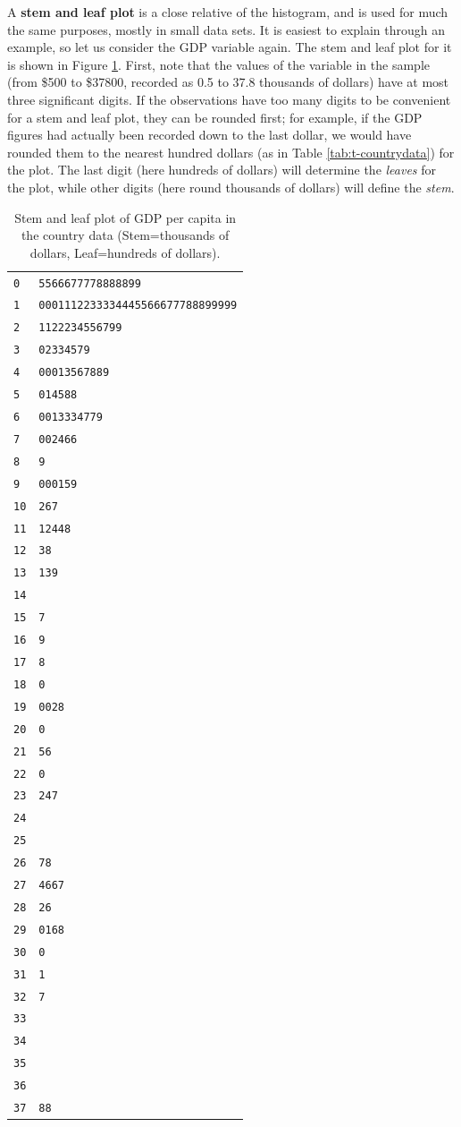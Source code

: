 \documentclass[11pt,a4paper,openany]{book}
\begin{document}
A \textbf{stem and leaf plot} is a close relative of the histogram, and
is used for much the same purposes, mostly in small data sets. It is
easiest to explain through an example, so let us consider the GDP
variable again. The stem and leaf plot for it is shown in Figure
\ref{tab:t-stemgdp}. First, note that the values of the variable in the
sample (from \$500 to \$37800, recorded as 0.5 to 37.8 thousands of
dollars) have at most three significant digits. If the observations have
too many digits to be convenient for a stem and leaf plot, they can be
rounded first; for example, if the GDP figures had actually been
recorded down to the last dollar, we would have rounded them to the
nearest hundred dollars (as in Table \ref{tab:t-countrydata}) for the
plot. The last digit (here hundreds of dollars) will determine the
\emph{leaves} for the plot, while other digits (here round thousands of
dollars) will define the \emph{stem}.

\begin{longtable}[]{@{}ll@{}}
\caption{\label{tab:t-stemgdp} Stem and leaf plot of GDP per capita in the
country data (Stem=thousands of dollars, Leaf=hundreds of
dollars).}\tabularnewline
\toprule
\texttt{0} & \texttt{5566677778888899}\tabularnewline
\texttt{1} & \texttt{0001112233334445566677788899999}\tabularnewline
\texttt{2} & \texttt{1122234556799}\tabularnewline
\texttt{3} & \texttt{02334579}\tabularnewline
\texttt{4} & \texttt{00013567889}\tabularnewline
\texttt{5} & \texttt{014588}\tabularnewline
\texttt{6} & \texttt{0013334779}\tabularnewline
\texttt{7} & \texttt{002466}\tabularnewline
\texttt{8} & \texttt{9}\tabularnewline
\texttt{9} & \texttt{000159}\tabularnewline
\texttt{10} & \texttt{267}\tabularnewline
\texttt{11} & \texttt{12448}\tabularnewline
\texttt{12} & \texttt{38}\tabularnewline
\texttt{13} & \texttt{139}\tabularnewline
\texttt{14} &\tabularnewline
\texttt{15} & \texttt{7}\tabularnewline
\texttt{16} & \texttt{9}\tabularnewline
\texttt{17} & \texttt{8}\tabularnewline
\texttt{18} & \texttt{0}\tabularnewline
\texttt{19} & \texttt{0028}\tabularnewline
\texttt{20} & \texttt{0}\tabularnewline
\texttt{21} & \texttt{56}\tabularnewline
\texttt{22} & \texttt{0}\tabularnewline
\texttt{23} & \texttt{247}\tabularnewline
\texttt{24} &\tabularnewline
\texttt{25} &\tabularnewline
\texttt{26} & \texttt{78}\tabularnewline
\texttt{27} & \texttt{4667}\tabularnewline
\texttt{28} & \texttt{26}\tabularnewline
\texttt{29} & \texttt{0168}\tabularnewline
\texttt{30} & \texttt{0}\tabularnewline
\texttt{31} & \texttt{1}\tabularnewline
\texttt{32} & \texttt{7}\tabularnewline
\texttt{33} &\tabularnewline
\texttt{34} &\tabularnewline
\texttt{35} &\tabularnewline
\texttt{36} &\tabularnewline
\texttt{37} & \texttt{88}\tabularnewline
\bottomrule
\end{longtable}
\end{document}
